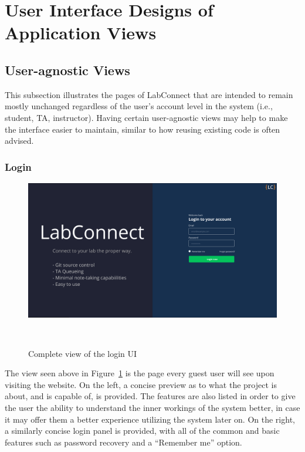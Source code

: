 \documentclass[a4paper, 12pt]{article}
\begin{document}
    
    
    
    
    
    
    
    \pagebreak
    
    \section{User Interface Designs of Application Views}
    
    \subsection{User-agnostic Views}
    
    This subsection illustrates the pages of LabConnect that are intended to remain mostly unchanged regardless of the user's account level in the system
    (i.e., student, TA, instructor). Having certain user-agnostic views may help to make the interface easier to maintain, similar to how
    reusing existing code is often advised.
    
    \subsubsection{Login}
    
    \begin{figure}[H]
        \centering
        \includegraphics[width=\textwidth]{login}
        \caption{Complete view of the login UI}~\label{fig:login_full}
    \end{figure}
    
    The view seen above in Figure~\ref{fig:login_full} is the page every guest user will see upon visiting the website.
    On the left, a concise preview as to what the project is about, and is capable of, is provided.
    The features are also listed in order to give the user the ability to understand the inner workings of the
    system better, in case it may offer them a better experience utilizing the system later on.
    On the right, a similarly concise login panel is provided, with all of the common and basic features
    such as password recovery and a ``Remember me'' option.
    
\end{document}
